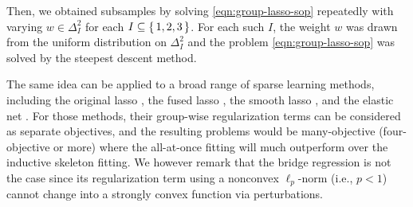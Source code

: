 \documentclass{article}
\begin{document}
Then, we obtained subsamples by solving \cref{eqn:group-lasso-sop} repeatedly with varying $w \in \Delta^2_I$ for each $I \subseteq \set{1, 2, 3}$.
For each such $I$, the weight $w$ was drawn from the uniform distribution on $\Delta^2_I$ and the problem \cref{eqn:group-lasso-sop} was solved by the steepest descent method.

The same idea can be applied to a broad range of sparse learning methods, including the original lasso \cite{Tibshirani1996}, the fused lasso \cite{Tibshirani2005}, the smooth lasso \cite{Hebiri2011}, and the elastic net \cite{Zou2005}.
For those methods, their group-wise regularization terms can be considered as separate objectives, and the resulting problems would be many-objective (four-objective or more) where the all-at-once fitting will much outperform over the inductive skeleton fitting.
We however remark that the bridge regression \cite{Frank1993} is not the case since its regularization term using a nonconvex $\ell_p$-norm (i.e., $p < 1$) cannot change into a strongly convex function via perturbations.
\end{document}
